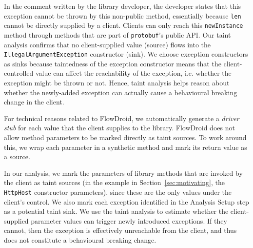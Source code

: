 In the comment written by the library developer, the developer states that this exception cannot be thrown by this non-public method, essentially because \texttt{len} cannot be directly supplied by a client. Clients can only reach this \texttt{newInstance} method through methods that are part of \texttt{protobuf}'s public API. Our taint analysis confirms that no client-supplied value (source) flows into the \texttt{IllegalArgumentException} constructor (sink). We choose exception constructors as sinks because taintedness of the exception constructor means that the client-controlled value can affect the reachability of the exception, i.e. whether the exception might be thrown or not. Hence, taint analysis helps reason about whether the newly-added exception can actually cause a behavioural breaking change in the client.

For technical reasons related to FlowDroid, we automatically generate a \textit{driver stub} for each value that the client supplies to the library. FlowDroid does not allow method parameters to be marked directly as taint sources. To work around this, we wrap each parameter in a synthetic method and mark its return value as a source.

In our analysis, we mark the parameters of library methods that are invoked by the client as taint sources (in the example in Section~\ref{sec:motivating}, the \texttt{HttpHost} constructor parameters), since these are the only values under the client’s control. We also mark each exception identified in the Analysis Setup step as a potential taint sink. We use the taint analysis to estimate whether the client-supplied parameter values can trigger newly introduced exceptions. If they cannot, then the exception is effectively unreachable from the client, and thus does not constitute a behavioural breaking change. 



